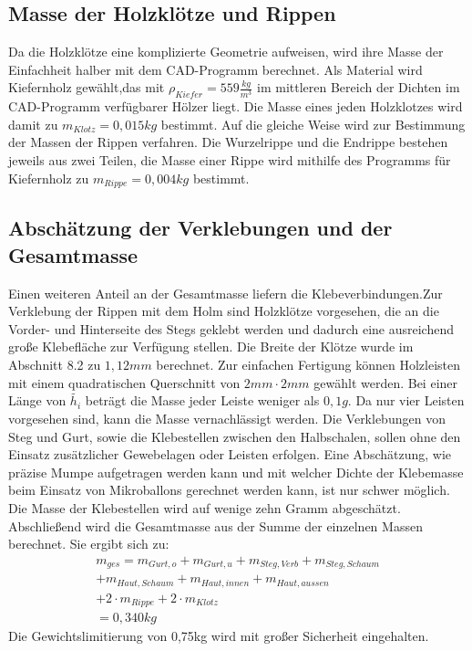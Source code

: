 \subsection{Masse der Holzklötze und Rippen}
Da die Holzklötze eine komplizierte Geometrie aufweisen, wird ihre Masse der Einfachheit halber mit dem CAD-Programm berechnet. Als Material wird Kiefernholz gewählt,das mit $ \rho_{Kiefer}=559\frac{kg}{m^{3}} $ im mittleren Bereich der Dichten im CAD-Programm verfügbarer Hölzer liegt. Die Masse eines jeden Holzklotzes wird damit zu $ m_{Klotz}=0,015kg $ bestimmt.
Auf die gleiche Weise wird zur Bestimmung der Massen der Rippen verfahren. Die Wurzelrippe und die Endrippe bestehen jeweils aus zwei Teilen, die Masse einer Rippe wird mithilfe des Programms für Kiefernholz zu $ m_{Rippe}=0,004kg $ bestimmt.

\subsection{Abschätzung der Verklebungen und der Gesamtmasse}
Einen weiteren Anteil an der Gesamtmasse liefern die Klebeverbindungen.Zur Verklebung der Rippen mit dem Holm sind Holzklötze vorgesehen, die an die Vorder- und Hinterseite des Stegs geklebt werden und dadurch eine ausreichend große Klebefläche zur Verfügung stellen. Die Breite der Klötze wurde im Abschnitt 8.2 zu $ 1,12mm $ berechnet. Zur einfachen Fertigung können Holzleisten mit einem quadratischen Querschnitt von $ 2mm\cdot2mm $ gewählt werden. Bei einer Länge von $ \tilde{h_{i}} $ beträgt die Masse jeder Leiste weniger als $ 0,1g $. Da nur vier Leisten vorgesehen sind, kann die Masse vernachlässigt werden. Die Verklebungen von Steg und Gurt, sowie die Klebestellen zwischen den Halbschalen, sollen ohne den Einsatz zusätzlicher Gewebelagen oder Leisten erfolgen. Eine Abschätzung, wie präzise Mumpe aufgetragen werden kann und mit welcher Dichte der Klebemasse beim Einsatz von Mikroballons gerechnet werden kann, ist nur schwer möglich. Die Masse der Klebestellen wird auf wenige zehn Gramm abgeschätzt.\\

\noindent Abschließend wird die Gesamtmasse aus der Summe der einzelnen Massen berechnet. Sie ergibt sich zu:
\begin{equation}
\begin{array}{l}
	m_{ges}= m_{Gurt,o}+m_{Gurt,u}+m_{Steg,Verb}+m_{Steg,Schaum} \\ +m_{Haut,Schaum}+m_{Haut,innen}+m_{Haut,aussen} \\ +2\cdot m_{Rippe}+2\cdot m_{Klotz} \\=0,340kg
\end{array}  
\end{equation}
Die Gewichtslimitierung von 0,75kg wird mit großer Sicherheit eingehalten.

